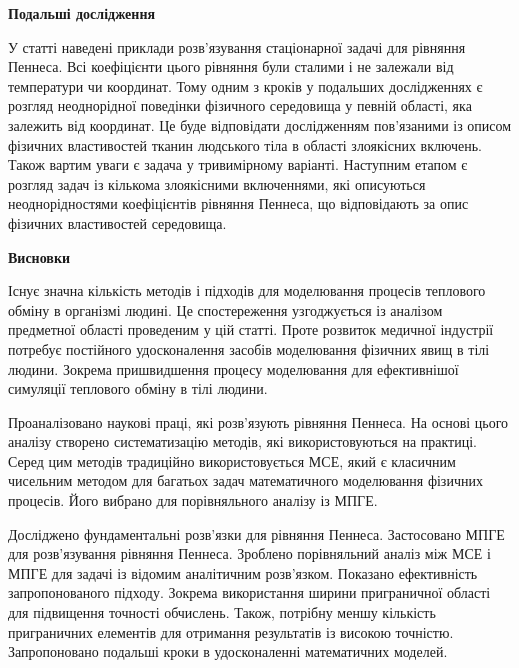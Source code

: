 \begin{center}
  \textbf{Подальші дослідження}
\end{center}

У статті наведені приклади розв'язування стаціонарної задачі для рівняння Пеннеса. Всі коефіцієнти цього рівняння були 
сталими і не залежали від температури чи координат. Тому одним з кроків у подальших дослідженнях є розгляд неоднорідної
поведінки фізичного середовища у певній області, яка залежить від координат. Це буде відповідати дослідженням 
пов'язаними із описом фізичних властивостей тканин людського тіла в області злоякісних включень. Також вартим уваги є 
задача у тривимірному варіанті. Наступним етапом є розгляд задач із кількома злоякісними включеннями, які описуються 
неоднорідностями коефіцієнтів рівняння Пеннеса, що відповідають за опис фізичних властивостей середовища.

\begin{center}
  \textbf{Висновки}
\end{center}
  
Існує значна кількість методів і підходів для моделювання процесів теплового обміну в організмі людині. Це спостереження
узгоджується із аналізом предметної області проведеним у цій статті. Проте розвиток медичної індустрії потребує
постійного удосконалення засобів моделювання фізичних явищ в тілі людини. Зокрема пришвидшення процесу моделювання для
ефективнішої симуляції теплового обміну в тілі людини.

Проаналізовано наукові праці, які розв'язують рівняння Пеннеса. На основі цього аналізу створено систематизацію методів,
які використовуються на практиці. Серед цим методів традиційно використовується МСЕ, який є класичним чисельним методом
для багатьох задач математичного моделювання фізичних процесів. Його вибрано для порівняльного аналізу із МПГЕ.

Досліджено фундаментальні розв'язки для рівняння Пеннеса. Застосовано МПГЕ для розв'язування рівняння Пеннеса. Зроблено
порівняльний аналіз між МСЕ і МПГЕ для задачі із відомим аналітичним розв'язком. Показано ефективність запропонованого
підходу. Зокрема використання ширини приграничної області для підвищення точності обчислень. Також, потрібну меншу
кількість приграничних елементів для отримання результатів із високою точністю. Запропоновано подальші кроки в
удосконаленні математичних моделей.   
